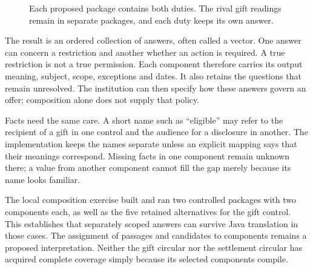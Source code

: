 \documentclass[12pt,a4paper,oneside,openany]{book}
\begin{document}
\begin{figure}[htbp]
\centering
{}
\caption{Each proposed package contains both duties. The rival gift readings
remain in separate packages, and each duty keeps its own answer.}
\label{fig:component-alternatives}
\end{figure}

The result is an ordered collection of answers, often called a vector. One
answer can concern a restriction and another whether an action is required.
A true restriction is not a true permission. Each component therefore carries
its output meaning, subject, scope, exceptions and dates. It also retains the
questions that remain unresolved. The institution can then specify how these
answers govern an offer; composition alone does not supply that policy.

Facts need the same care. A short name such as ``eligible'' may refer to the
recipient of a gift in one control and the audience for a disclosure in another.
The implementation keeps the names separate unless an explicit mapping says
that their meanings correspond. Missing facts in one component remain unknown
there; a value from another component cannot fill the gap merely because its
name looks familiar.

The local composition exercise built and ran two controlled packages with two
components each, as well as the five retained alternatives for the gift
control. This establishes that separately scoped answers can survive Java
translation in those cases. The assignment of passages and candidates to
components remains a proposed interpretation. Neither the gift circular nor
the settlement circular has acquired complete coverage simply because its
selected components compile.

\end{document}
